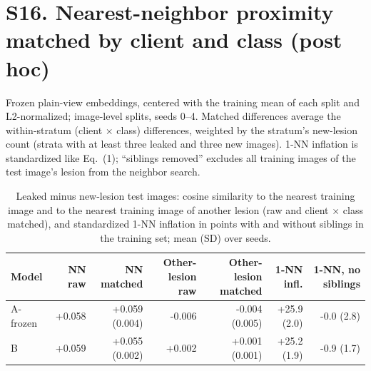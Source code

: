 \documentclass[10pt]{article}
\begin{document}
\section*{S16. Nearest-neighbor proximity matched by client and class (post hoc)}
Frozen plain-view embeddings, centered with the training mean of each split and L2-normalized; image-level splits, seeds 0--4. Matched differences average the within-stratum (client $\times$ class) differences, weighted by the stratum's new-lesion count (strata with at least three leaked and three new images). 1-NN inflation is standardized like Eq.~(1); ``siblings removed'' excludes all training images of the test image's lesion from the neighbor search.
\begin{table}[!htbp]
\centering
\scriptsize
\caption{Leaked minus new-lesion test images: cosine similarity to the nearest training image and to the nearest training image of another lesion (raw and client $\times$ class matched), and standardized 1-NN inflation in points with and without siblings in the training set; mean (SD) over seeds.}
\label{tab:s17nn}
\begin{tabular}{@{}lrrrrrr@{}}
\toprule
Model & NN raw & NN matched & Other-lesion raw & Other-lesion matched & 1-NN infl. & 1-NN, no siblings \\
\midrule
A-frozen & +0.058 & +0.059 (0.004) & -0.006 & -0.004 (0.005) & +25.9 (2.0) & -0.0 (2.8) \\
B & +0.059 & +0.055 (0.002) & +0.002 & +0.001 (0.001) & +25.2 (1.9) & -0.9 (1.7) \\
\bottomrule
\end{tabular}
\end{table}
\end{document}
